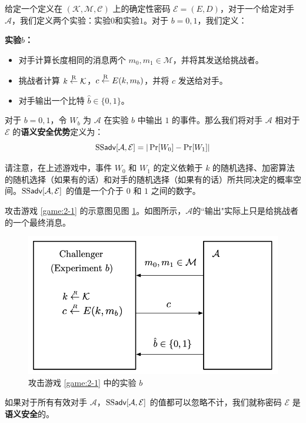 \begin{game}[语义安全性]\label{game:2-1}
给定一个定义在 $(\mathcal{K},\mathcal{M},\mathcal{C})$ 上的确定性密码 $\mathcal{E}=(E,D)$，对于一个给定对手 $\mathcal{A}$，我们定义两个实验：实验$0$和实验$1$。对于 $b=0,1$，我们定义：

\noindent\textbf{实验$b$：}
\begin{itemize}
	\item 对手计算长度相同的消息两个 $m_0,m_1\in\mathcal{M}$，并将其发送给挑战者。
	\item 挑战者计算 $k\overset{\rm R}\leftarrow\mathcal{K}$，$c\overset{\rm R}\leftarrow E(k,m_b)$，并将 $c$ 发送给对手。
	\item 对手输出一个比特 $\hat b\in\{0,1\}$。
\end{itemize}

对于 $b=0,1$，令 $W_b$ 为 $\mathcal{A}$ 在实验 $b$ 中输出 $1$ 的事件。那么我们将对手 $\mathcal{A}$ 相对于 $\mathcal{E}$ 的\textbf{语义安全优势}定义为：
$$
{\rm SS\mathsf{adv}}[\mathcal{A},\mathcal{E}]=|\Pr[W_0] -\Pr[W_1]|
$$
\end{game}

请注意，在上述游戏中，事件 $W_0$ 和 $W_1$ 的定义依赖于 $k$ 的随机选择、加密算法的随机选择（如果有的话）和对手的随机选择（如果有的话）所共同决定的概率空间。${\rm SS\mathsf{adv}}[\mathcal{A},\mathcal{E}]$ 的值是一个介于 $0$ 和 $1$ 之间的数字。

攻击游戏 \ref{game:2-1} 的示意图见图 \ref{fig:2-1}。如图所示，$\mathcal{A}$的``输出"实际上只是给挑战者的一个最终消息。

\begin{figure}
  \centering
  \includegraphics[width=0.5\linewidth]{figures/chapter2/fig1.png}
  \caption{攻击游戏 \ref{game:2-1} 中的实验 $b$}
  \label{fig:2-1}
\end{figure}

\begin{definition}[语义安全性]\label{def:2-2}
如果对于所有有效对手 $\mathcal{A}$，${\rm SS\mathsf{adv}}[\mathcal{A},\mathcal{E}]$ 的值都可以忽略不计，我们就称密码 $\mathcal{E}$ 是\textbf{语义安全}的。
\end{definition}

